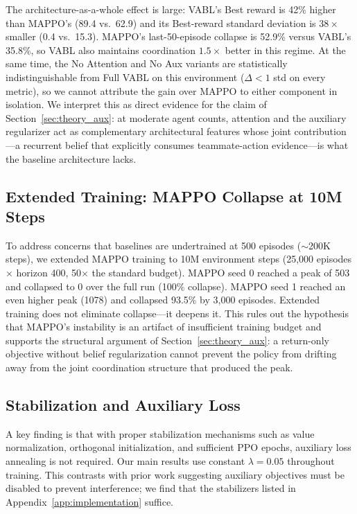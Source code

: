 \documentclass{article}
\theoremstyle{plain}
\theoremstyle{definition}
\theoremstyle{remark}
\begin{document}
The architecture-as-a-whole effect is large: VABL's Best reward is 42\% higher than MAPPO's (89.4 vs.\ 62.9) and its Best-reward standard deviation is $38\times$ smaller (0.4 vs.\ 15.3). MAPPO's last-50-episode collapse is 52.9\% versus VABL's 35.8\%, so VABL also maintains coordination $1.5\times$ better in this regime. At the same time, the No Attention and No Aux variants are statistically indistinguishable from Full VABL on this environment ($\Delta < 1$ std on every metric), so we cannot attribute the gain over MAPPO to either component in isolation. We interpret this as direct evidence for the claim of Section~\ref{sec:theory_aux}: at moderate agent counts, attention and the auxiliary regularizer act as complementary architectural features whose joint contribution---a recurrent belief that explicitly consumes teammate-action evidence---is what the baseline architecture lacks.

\subsection{Extended Training: MAPPO Collapse at 10M Steps}

To address concerns that baselines are undertrained at 500 episodes ($\sim$200K steps), we extended MAPPO training to 10M environment steps (25,000 episodes $\times$ horizon 400, 50$\times$ the standard budget). MAPPO seed 0 reached a peak of 503 and collapsed to 0 over the full run (100\% collapse). MAPPO seed 1 reached an even higher peak (1078) and collapsed 93.5\% by 3,000 episodes. Extended training does not eliminate collapse---it deepens it. This rules out the hypothesis that MAPPO's instability is an artifact of insufficient training budget and supports the structural argument of Section~\ref{sec:theory_aux}: a return-only objective without belief regularization cannot prevent the policy from drifting away from the joint coordination structure that produced the peak.

\subsection{Stabilization and Auxiliary Loss}

A key finding is that with proper stabilization mechanisms such as value normalization, orthogonal initialization, and sufficient PPO epochs, auxiliary loss annealing is not required. Our main results use constant $\lambda = 0.05$ throughout training. This contrasts with prior work suggesting auxiliary objectives must be disabled to prevent interference; we find that the stabilizers listed in Appendix~\ref{app:implementation} suffice.
\end{document}
